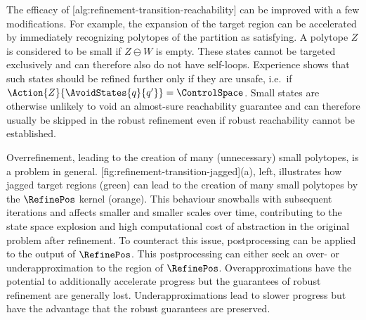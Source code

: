 
    The efficacy of [alg:refinement-transition-reachability] can be improved with a few modifications.
    For example, the expansion of the target region can be accelerated by immediately recognizing  polytopes of the partition as satisfying.
    A polytope $Z$ is considered to be small if $Z \ominus W$ is empty.
    These states cannot be targeted exclusively and can therefore also do not have self-loops.
    Experience shows that such states should be refined further only if they are unsafe, i.e.\ if $\Action{Z}{\AvoidStates{q}{q'}} = \ControlSpace$.
    Small states are otherwise unlikely to void an almost-sure reachability guarantee and can therefore usually be skipped in the robust refinement even if robust reachability cannot be established.

    Overrefinement, leading to the creation of many (unnecessary) small polytopes, is a problem in general.
    [fig:refinement-transition-jagged](a), left, illustrates how jagged target regions (green) can lead to the creation of many small polytopes by the $\RefinePos$ kernel (orange).
    This behaviour snowballs with subsequent iterations and affects smaller and smaller scales over time, contributing to the state space explosion and high computational cost of abstraction in the original problem after refinement.
    To counteract this issue, postprocessing can be applied to the output of $\RefinePos$.
    This postprocessing can either seek an over- or underapproximation to the region of $\RefinePos$.
    Overapproximations have the potential to additionally accelerate progress but the guarantees of robust refinement are generally lost.
    Underapproximations lead to slower progress but have the advantage that the robust guarantees are preserved.

